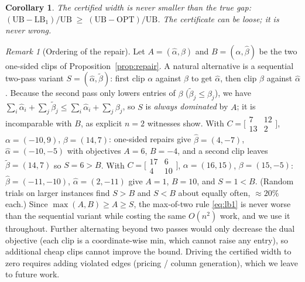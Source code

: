 \documentclass[11pt]{article}
\newtheorem{corollary}{Corollary}
\theoremstyle{remark}
\newtheorem{remark}{Remark}
\begin{document}
\begin{corollary}
\label{cor:gap}
The certified width is never smaller than the true gap:
$(\mathrm{UB}-\mathrm{LB}_1)/\mathrm{UB}\;\ge\;(\mathrm{UB}-\mathrm{OPT})/\mathrm{UB}$.
The certificate can be loose; it is never wrong.
\end{corollary}

\begin{remark}[Ordering of the repair]
\label{rem:order}
Let $A=(\hat\alpha,\beta)$ and $B=(\alpha,\hat\beta)$ be the two one-sided
clips of Proposition~\ref{prop:repair}. A natural alternative is a
sequential two-pass variant $S=(\hat\alpha,\tilde\beta)$: first clip $\alpha$
against $\beta$ to get $\hat\alpha$, then clip $\beta$ against
$\hat\alpha$. Because the second pass only lowers entries of $\beta$
($\tilde\beta_j\le\beta_j$), we have $\sum_i\hat\alpha_i+\sum_j\tilde\beta_j
\le \sum_i\hat\alpha_i+\sum_j\beta_j$, so $S$ is \emph{always dominated}
by $A$; it is incomparable with $B$, as explicit $n=2$ witnesses
show. With $C=\bigl[\begin{smallmatrix}7&12\\13&2\end{smallmatrix}\bigr]$,
$\alpha=(-10,9)$, $\beta=(14,7)$: one-sided repairs give
$\hat\beta=(4,-7)$, $\hat\alpha=(-10,-5)$ with objectives $A=6$, $B=-4$,
and a second clip leaves $\tilde\beta=(14,7)$ so $S=6>B$.
With $C=\bigl[\begin{smallmatrix}17&6\\4&10\end{smallmatrix}\bigr]$,
$\alpha=(16,15)$, $\beta=(15,-5)$:
$\hat\beta=(-11,-10)$, $\hat\alpha=(2,-11)$ give $A=1$, $B=10$,
and $S=1<B$. (Random trials on larger instances find $S>B$ and $S<B$
about equally often, $\approx 20\%$ each.) Since
$\max(A,B)\ge A\ge S$, the max-of-two rule \eqref{eq:lb1} is never worse
than the sequential variant while costing the same $O(n^2)$ work, and we
use it throughout.
Further alternating beyond two passes would only decrease the dual
objective (each clip is a coordinate-wise min, which cannot raise any
entry), so additional cheap clips cannot improve the bound. Driving the
certified width to zero requires adding violated edges (pricing / column
generation), which we leave to future work.
\end{remark}
\end{document}
